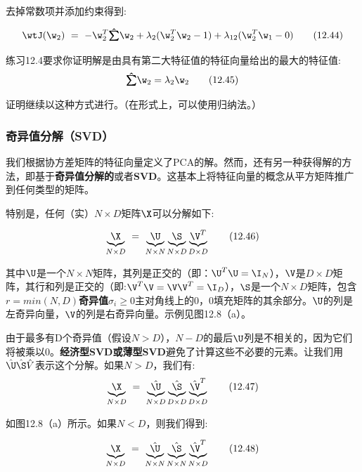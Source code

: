 \documentclass[a4paper]{article}
\begin{document}
去掉常数项并添加约束得到:

\begin{equation}
	\wtJ(\w_2)\ =\ -\w_2^T\textstyle\boldsymbol{\hat{\sum}}\w_2+\lambda_2(\w_2^T\w_2-1)+\lambda_{12}(\w_2^T\w_1-0)\tag{12.44}
\end{equation}

练习12.4要求你证明解是由具有第二大特征值的特征向量给出的最大的特征值:
\begin{equation}
	\textstyle\boldsymbol{\hat{\sum}}\w_2=\lambda_2\w_2\tag{12.45}
\end{equation}

证明继续以这种方式进行。（在形式上，可以使用归纳法。） 

\subsubsection{奇异值分解（SVD） }
我们根据协方差矩阵的特征向量定义了PCA的解。然而，还有另一种获得解的方法，即基于\textbf{奇异值分解的}或者\textbf{SVD}。这基本上将特征向量的概念从平方矩阵推广到任何类型的矩阵。

特别是，任何（实）$N\times D$矩阵$\X$可以分解如下: 

\begin{equation}
	\underbrace{\X}_{N\times D}\ =\ \underbrace{\U}_{N\times N}\underbrace{\S}_{N\times D}\underbrace{\V^T}_{D\times D}\tag{12.46}
\end{equation}

其中$\U$是一个$N\times N$矩阵，其列是正交的（即：$\U^T\U=\I_N$），$\V$是$D\times D$矩阵，其行和列是正交的（即:$\V^T\V=\V\V^T=\I_D$），$\S$是一个$N\times D$矩阵，包含$r=min(N,D)$\textbf{奇异值}$\sigma_i\geq 0$主对角线上的0，0填充矩阵的其余部分。$\U$的列是左奇异向量，$\V$的列是右奇异向量。示例见图12.8（a）。 

由于最多有D个奇异值（假设$N>D$），$N-D$的最后$\U$列是不相关的，因为它们将被乘以0。\textbf{经济型SVD或薄型SVD}避免了计算这些不必要的元素。让我们用$\hat{\U}\hat{\S}\hat{V}$表示这个分解。如果$N>D$，我们有:
\begin{equation}
	\underbrace{\X}_{N\times D}\ =\ \underbrace{\hat{\U}}_{N\times D}\underbrace{\hat{\S}}_{D\times D}\underbrace{\hat\V^T}_{D\times D}\tag{12.47}
\end{equation}

如图12.8（a）所示。如果$N<D$，则我们得到:
 
\begin{equation}
\underbrace{\X}_{N\times D}\ =\ \underbrace{\hat{\U}}_{N\times N}\underbrace{\hat{\S}}_{N\times N}\underbrace{\hat\V^T}_{N\times D}\tag{12.48}
\end{equation}
\end{document}

